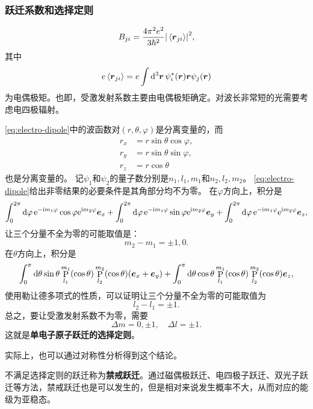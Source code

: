 \documentclass[UTF8, a4paper]{ctexart}
\newcommand*{\ee}{\mathrm{e}}
\newcommand*{\ii}{\mathrm{i}}
\DeclareMathOperator{\legpoly}{P}
\begin{document}
\subsubsection{跃迁系数和选择定则}

\begin{equation}
    B_{ji} = \frac{4\pi^2 e^2}{3 \hbar^2} \abs{\expval*{\vb*{r}_{ji}}}^2,
\end{equation}
其中
\begin{equation}
    e \expval*{\vb*{r}_{ji}} = e \int \dd[3]{\vb*{r}} \psi_i^*(\vb*{r}) \vb*{r} \psi_j(\vb*{r})
    \label{eq:electro-dipole}
\end{equation}
为电偶极矩。也即，受激发射系数主要由电偶极矩确定。对波长非常短的光需要考虑电四极辐射。

\eqref{eq:electro-dipole}中的波函数对$(r, \theta, \varphi)$是分离变量的，而
\[
    \begin{aligned}
        r_x &= r \sin \theta \cos \varphi, \\
        r_y &= r \sin \theta \sin \varphi, \\
        r_z &= r \cos \theta 
    \end{aligned}
\]
也是分离变量的。
记$\psi_1$和$\psi_2$的量子数分别是$n_1, l_1, m_1$和$n_2, l_2, m_2$。
\eqref{eq:electro-dipole}给出非零结果的必要条件是其角部分均不为零。
在$\varphi$方向上，积分是
\[
    \int_0^{2\pi} \dd{\varphi} \ee^{ - \ii m_1 \varphi} \cos \varphi \ee^{\ii m_2 \varphi} \vb*{e}_x + \int_0^{2\pi} \dd{\varphi} \ee^{ - \ii m_1 \varphi} \sin \varphi \ee^{\ii m_2 \varphi} \vb*{e}_y + \int_0^{2\pi} \dd{\varphi} \ee^{ - \ii m_1 \varphi} \ee^{\ii m_2 \varphi} \vb*{e}_z,
\]
让三个分量不全为零的可能取值是：
\[
    m_2 - m_1 = \pm 1, 0.
\]
在$\theta$方向上，积分是
\[
    \int_0^\pi \dd{\theta} \sin \theta \legpoly_{l_1}^{m_1} (\cos \theta) \legpoly_{l_2}^{m_2} (\cos \theta) (\vb*{e}_x + \vb*{e}_y) + \int_0^\pi \dd{\theta} \cos \theta \legpoly_{l_1}^{m_1} (\cos \theta) \legpoly_{l_2}^{m_2} (\cos \theta) \vb*{e}_z,
\]
使用勒让德多项式的性质，可以证明让三个分量不全为零的可能取值为
\[
    l_2 - l_1 = \pm 1.
\]
总之，要让受激发射系数不为零，需要
\begin{equation}
    \Delta m = 0, \pm 1, \quad \Delta l = \pm 1.
\end{equation}
这就是\textbf{单电子原子跃迁的选择定则}。

实际上，也可以通过对称性分析得到这个结论。

不满足选择定则的跃迁称为\textbf{禁戒跃迁}。通过磁偶极跃迁、电四极子跃迁、双光子跃迁等方法，禁戒跃迁也是可以发生的，但是相对来说发生概率不大，从而对应的能级为亚稳态。
\end{document}
